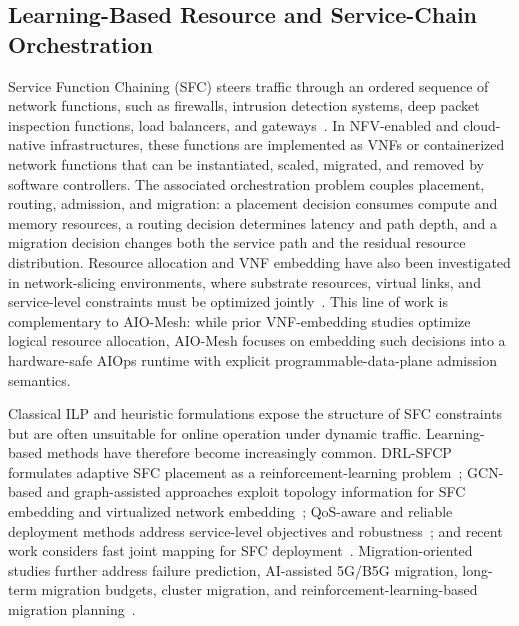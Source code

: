 \documentclass[final,5p]{elsarticle}
\begin{document}
\subsection{Learning-Based Resource and Service-Chain Orchestration}
\label{subsec:related_learning}

Service Function Chaining (SFC) steers traffic through an ordered sequence of network functions, such as firewalls, intrusion detection systems, deep packet inspection functions, load balancers, and gateways~\cite{rfc7665}. In NFV-enabled and cloud-native infrastructures, these functions are implemented as VNFs or containerized network functions that can be instantiated, scaled, migrated, and removed by software controllers. The associated orchestration problem couples placement, routing, admission, and migration: a placement decision consumes compute and memory resources, a routing decision determines latency and path depth, and a migration decision changes both the service path and the residual resource distribution. Resource allocation and VNF embedding have also been investigated in network-slicing environments, where substrate resources, virtual links, and service-level constraints must be optimized jointly~\cite{jOptimizeSlice24}. This line of work is complementary to AIO-Mesh: while prior VNF-embedding studies optimize logical resource allocation, AIO-Mesh focuses on embedding such decisions into a hardware-safe AIOps runtime with explicit programmable-data-plane admission semantics.

Classical ILP and heuristic formulations expose the structure of SFC constraints but are often unsuitable for online operation under dynamic traffic. Learning-based methods have therefore become increasingly common. DRL-SFCP formulates adaptive SFC placement as a reinforcement-learning problem~\cite{wang2021drl}; GCN-based and graph-assisted approaches exploit topology information for SFC embedding and virtualized network embedding~\cite{xiao2023twostage,pei2025graph,liu2024sfcml}; QoS-aware and reliable deployment methods address service-level objectives and robustness~\cite{taktak2024drl,li2023qosaware,qu2021reliable}; and recent work considers fast joint mapping for SFC deployment~\cite{wu2025drl}. Migration-oriented studies further address failure prediction, AI-assisted 5G/B5G migration, long-term migration budgets, cluster migration, and reinforcement-learning-based migration planning~\cite{zhai2023migration,addad2022ai,qin2023sfcmigrationbudget,afrasiabi2024cluster,zhang2025sfcmigration,hu2026rlpmo}.
\end{document}
